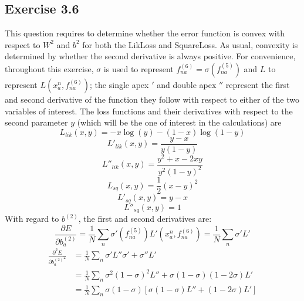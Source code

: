 \documentclass[fleqn]{article}
\begin{document}
\subsection*{Exercise 3.6}
This question requires to determine whether the error function is convex with respect to $W^2$ and $b^2$ for both the LikLoss and SquareLoss. As usual, convexity is determined by whether the second derivative is always positive. For convenience, throughout this exercise, $\sigma$ is used to represent $f^{(6)}_{na} = \sigma \left ( f^{(5)}_{na} \right )$ and $L$ to represent $L \left(x^n_a, f^{(6)}_{na}\right)$; the single apex $'$ and double apex $''$ represent the first and second derivative of the function they follow with respect to either of the two variables of interest. The loss functions and their derivatives with respect to the second parameter $y$ (which will be the one of interest in the calculations) are
\begin{equation}
    L_{lik}(x, y) = - x \log ( y ) - (1-x)\log(1-y)
\end{equation}
\begin{equation}
    L'_{lik}(x, y) = \frac{y-x}{y(1-y)}
\end{equation}
\begin{equation}
    L''_{lik}(x, y) = \frac{y^2+x-2xy}{y^2(1-y)^2}
\end{equation}
\begin{equation}
    L_{sq}(x, y) = \frac{1}{2} (x -  y)^2
\end{equation}
\begin{equation}
    L'_{sq}(x, y) = y - x
\end{equation}
\begin{equation}
    L''_{sq}(x, y) = 1
\end{equation}
With regard to $b^{(2)}$, the first and second derivatives are:
\begin{equation}
    \frac{\partial E}{\partial b^{(2)}_{a}} = \frac{1}{N} \sum_n \sigma'\left(f^{(5)}_{na}\right) L'\left(x^n_a, f^{(6)}_{na}\right) = \frac{1}{N} \sum_n \sigma' L'
\end{equation}
\begin{equation}
    \begin{split}
        \frac{\partial^2 E}{\partial {b^{(2)}_{a}}^2} & =
        \frac{1}{N} \sum_n \sigma'L''\sigma' + \sigma''L' \\
        & = \frac{1}{N} \sum_n \sigma^2 (1-\sigma)^2 L'' + \sigma (1-\sigma)(1-2\sigma) L' \\
        & = \frac{1}{N} \sum_n \sigma (1-\sigma)[\sigma(1-\sigma)L'' + (1-2\sigma)L']
    \end{split}
\end{equation}
\end{document}

